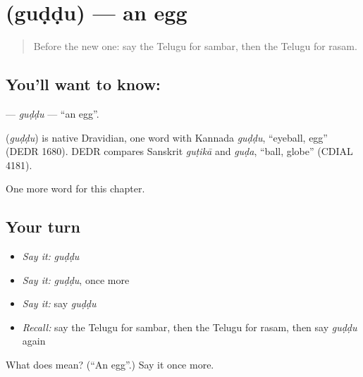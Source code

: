\section[\texorpdfstring{\te{గుడ్డు} (guḍḍu)}{గుడ్డు (guḍḍu)}]{ (guḍḍu) — an egg}

\label{lesson:TE-C116-guddu}



\begin{quote}
Before the new one: say the Telugu for sambar, then the Telugu for rasam.
\end{quote}

\subsection*{You'll want to know: }
\textbf{} — \emph{guḍḍu} — \textquotedblleft{}an egg\textquotedblright{}.

\begin{cousinweb}
\textbf{} (\emph{guḍḍu}) is native Dravidian, one word with Kannada \emph{guḍḍu}, \textquotedblleft{}eyeball, egg\textquotedblright{} (DEDR 1680). DEDR compares Sanskrit \emph{guṭikā} and \emph{guḍa}, \textquotedblleft{}ball, globe\textquotedblright{} (CDIAL 4181).
\end{cousinweb}

\begin{grammarlens}[title={What you've built}]
One more word for this chapter.
\end{grammarlens}

\subsection*{Your turn}
\begin{itemize}
\raggedright
  \item \emph{Say it:} \emph{guḍḍu}
  \item \emph{Say it:} \emph{guḍḍu}, once more
  \item \emph{Say it:} say \emph{guḍḍu}
  \item \emph{Recall:} say the Telugu for sambar, then the Telugu for rasam, then say \emph{guḍḍu} again
\end{itemize}

\begin{tcolorbox}[breakable,colback=teal!4,colframe=teal!35!black,title={Before you move on}]
What does  mean? (\textquotedblleft{}An egg\textquotedblright{}.) Say it once more.
\end{tcolorbox}
